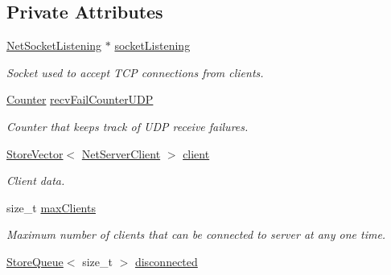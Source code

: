 \subsection*{Private Attributes}
\begin{DoxyCompactItemize}
\item 
\hypertarget{class_net_instance_server_a5c00d75b589e62553821f7278d0e851e}{
\hyperlink{class_net_socket_listening}{NetSocketListening} $\ast$ \hyperlink{class_net_instance_server_a5c00d75b589e62553821f7278d0e851e}{socketListening}}
\label{class_net_instance_server_a5c00d75b589e62553821f7278d0e851e}

\begin{DoxyCompactList}\small\item\em Socket used to accept TCP connections from clients. \item\end{DoxyCompactList}\item 
\hyperlink{class_counter}{Counter} \hyperlink{class_net_instance_server_a2f71d29128ad06c912dbf7d3cb5a1fe9}{recvFailCounterUDP}
\begin{DoxyCompactList}\small\item\em Counter that keeps track of UDP receive failures. \item\end{DoxyCompactList}\item 
\hypertarget{class_net_instance_server_a92484b7365cfad05ead9b44ed4a8ea17}{
\hyperlink{class_store_vector}{StoreVector}$<$ \hyperlink{class_net_server_client}{NetServerClient} $>$ \hyperlink{class_net_instance_server_a92484b7365cfad05ead9b44ed4a8ea17}{client}}
\label{class_net_instance_server_a92484b7365cfad05ead9b44ed4a8ea17}

\begin{DoxyCompactList}\small\item\em Client data. \item\end{DoxyCompactList}\item 
\hypertarget{class_net_instance_server_ae08f9f216c652168e54dc0f86dff2416}{
size\_\-t \hyperlink{class_net_instance_server_ae08f9f216c652168e54dc0f86dff2416}{maxClients}}
\label{class_net_instance_server_ae08f9f216c652168e54dc0f86dff2416}

\begin{DoxyCompactList}\small\item\em Maximum number of clients that can be connected to server at any one time. \item\end{DoxyCompactList}\item 
\hypertarget{class_net_instance_server_af628c8f03d1e55cc7a26ad309ac62418}{
\hyperlink{class_store_queue}{StoreQueue}$<$ size\_\-t $>$ \hyperlink{class_net_instance_server_af628c8f03d1e55cc7a26ad309ac62418}{disconnected}}
\label{class_net_instance_server_af628c8f03d1e55cc7a26ad309ac62418}


\end{DoxyCompactItemize}
